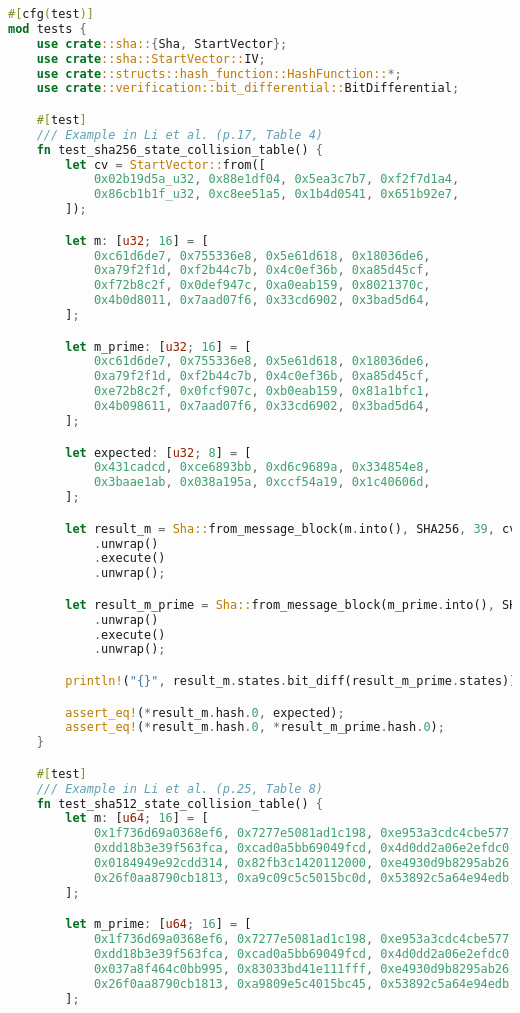 \begin{lstlisting}[language=rust, caption={verification/verification.rs}]
#[cfg(test)]
mod tests {
	use crate::sha::{Sha, StartVector};
	use crate::sha::StartVector::IV;
	use crate::structs::hash_function::HashFunction::*;
	use crate::verification::bit_differential::BitDifferential;

	#[test]
	/// Example in Li et al. (p.17, Table 4)
	fn test_sha256_state_collision_table() {
		let cv = StartVector::from([
			0x02b19d5a_u32, 0x88e1df04, 0x5ea3c7b7, 0xf2f7d1a4,
			0x86cb1b1f_u32, 0xc8ee51a5, 0x1b4d0541, 0x651b92e7,
		]);

		let m: [u32; 16] = [
			0xc61d6de7, 0x755336e8, 0x5e61d618, 0x18036de6,
			0xa79f2f1d, 0xf2b44c7b, 0x4c0ef36b, 0xa85d45cf,
			0xf72b8c2f, 0x0def947c, 0xa0eab159, 0x8021370c,
			0x4b0d8011, 0x7aad07f6, 0x33cd6902, 0x3bad5d64,
		];

		let m_prime: [u32; 16] = [
			0xc61d6de7, 0x755336e8, 0x5e61d618, 0x18036de6,
			0xa79f2f1d, 0xf2b44c7b, 0x4c0ef36b, 0xa85d45cf,
			0xe72b8c2f, 0x0fcf907c, 0xb0eab159, 0x81a1bfc1,
			0x4b098611, 0x7aad07f6, 0x33cd6902, 0x3bad5d64,
		];

		let expected: [u32; 8] = [
			0x431cadcd, 0xce6893bb, 0xd6c9689a, 0x334854e8,
			0x3baae1ab, 0x038a195a, 0xccf54a19, 0x1c40606d,
		];

		let result_m = Sha::from_message_block(m.into(), SHA256, 39, cv)
			.unwrap()
			.execute()
			.unwrap();

		let result_m_prime = Sha::from_message_block(m_prime.into(), SHA256, 39, cv)
			.unwrap()
			.execute()
			.unwrap();

		println!("{}", result_m.states.bit_diff(result_m_prime.states));

		assert_eq!(*result_m.hash.0, expected);
		assert_eq!(*result_m.hash.0, *result_m_prime.hash.0);
	}

	#[test]
	/// Example in Li et al. (p.25, Table 8)
	fn test_sha512_state_collision_table() {
		let m: [u64; 16] = [
			0x1f736d69a0368ef6, 0x7277e5081ad1c198, 0xe953a3cdc4cbe577, 0xbd05f6a203b2f75f,
			0xdd18b3e39f563fca, 0xcad0a5bb69049fcd, 0x4d0dd2a06e2efdc0, 0x86db19c26fc2e1cf,
			0x0184949e92cdd314, 0x82fb3c1420112000, 0xe4930d9b8295ab26, 0x5500d3a2f30a3402,
			0x26f0aa8790cb1813, 0xa9c09c5c5015bc0d, 0x53892c5a64e94edb, 0x8e60d500013a1932,
		];

		let m_prime: [u64; 16] = [
			0x1f736d69a0368ef6, 0x7277e5081ad1c198, 0xe953a3cdc4cbe577, 0xbd05f6a203b2f75f,
			0xdd18b3e39f563fca, 0xcad0a5bb69049fcd, 0x4d0dd2a06e2efdc0, 0x86db19c26fc2e1cf,
			0x037a8f464c0bb995, 0x83033bd41e111fff, 0xe4930d9b8295ab26, 0x5500d3a2f30a3402,
			0x26f0aa8790cb1813, 0xa9809e5c4015bc45, 0x53892c5a64e94edb, 0x8e60d500013a1932,
		];


\end{lstlisting}
